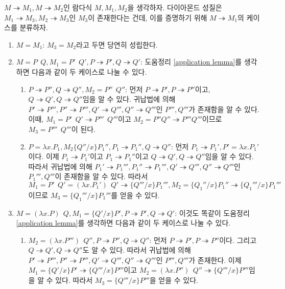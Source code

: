 \documentclass[b5paper, 11pt]{book}
\theoremstyle{definition}
\newenvironment{pf*}{\pushQED{\qed}\pf}
{\popQED\endpf}
\begin{document}
\begin{pf*}
    $M \twoheadrightarrow M_1, M \twoheadrightarrow M_2$인 람다식 $M, M_1, M_2$을 생각하자. 다이아몬드 성질은 $M_1 \twoheadrightarrow M_3, M_2 \twoheadrightarrow M_3$인 $M_3$이 존재한다는 건데, 이를 증명하기 위해 $M \twoheadrightarrow M_1$의 케이스를 분류하자.
    \begin{enumerate}
        \item $M = M_1$:
        $M_3 = M_2$라고 두면 당연히 성립한다.
        \item $M = P\;\, Q, M_1 = P' \;\, Q', P\twoheadrightarrow P', Q \twoheadrightarrow Q'$:
        도움정리 \ref{application lemma}를 생각하면 다음과 같이 두 케이스로 나눌 수 있다.
        \begin{enumerate}
            \item $P \twoheadrightarrow P'', Q \twoheadrightarrow Q'',  M_2 = P'' \;\, Q''$: 먼저 $P \twoheadrightarrow P', P \twoheadrightarrow P''$이고, $Q \twoheadrightarrow Q', Q \twoheadrightarrow Q''$임을 알 수 있다. 귀납법에 의해  $P' \twoheadrightarrow P''', P'' \twoheadrightarrow P''', Q' \twoheadrightarrow Q''', Q'' \twoheadrightarrow Q'''$인 $P''', Q'''$가 존재함을 알 수 있다. 이때, $M_1 = P' \;\, Q' \twoheadrightarrow P''' \;\, Q'''$이고 $M_2 = P'' Q'' \twoheadrightarrow P''' Q'''$이므로 $M_3 = P''' \;\, Q'''$이 된다.
             \item $P = \lambda x. P_1, M_2 \{Q'' / x\} P_1'' , P_1 \twoheadrightarrow P_1'',  Q \twoheadrightarrow Q''$: 먼저 $P_1 \twoheadrightarrow P_1', P' = \lambda x.P_1'$이다. 이제 $P_1 \twoheadrightarrow P_1'$이고 $P_1 \twoheadrightarrow P_1''$이고 $Q \twoheadrightarrow Q', Q\twoheadrightarrow Q''$임을 알 수 있다. 따라서 귀납법에 의해 $P_1' \twoheadrightarrow P_1''', P_1'' \twoheadrightarrow P_1''', Q' \twoheadrightarrow Q''', Q'' \twoheadrightarrow Q'''$인 $P_1''', Q'''$이 존재함을 알 수 있다. 따라서 $M_1 = P'\;\,Q' = (\lambda x. P_1')\;\, Q' \twoheadrightarrow \{Q'''/x\}P_1''', M_2 = \{Q_1''/x\}P_1'' \twoheadrightarrow \{Q_1''' / x\} P_1'''$이므로 $M_3 = \{Q_1'''/x\}P_1'''$를 얻을 수 있다.
        \end{enumerate}
        \item $M = (\lambda x. P) \;\, Q, M_1 = \{Q' / x \}P', P \twoheadrightarrow P', Q \twoheadrightarrow Q'$: 이것도 똑같이 도움정리 \ref{application lemma}를 생각하면 다음과 같이 두 케이스로 나눌 수 있다.
        \begin{enumerate}
            \item $M_2 = (\lambda x. P''') \;\, Q'', P \twoheadrightarrow P'', Q \twoheadrightarrow Q''$: 먼저 $P\twoheadrightarrow P', P \twoheadrightarrow P''$이다. 그리고 $Q \twoheadrightarrow Q', Q \twoheadrightarrow Q''$도 알 수 있다. 따라서 귀납법에 의해 $P' \twoheadrightarrow P''', P'' \twoheadrightarrow P''', Q' \twoheadrightarrow Q''', Q'' \twoheadrightarrow Q'''$인 $P''', Q'''$가 존재한다. 이제 $M_1 = \{Q'/x\}P' \twoheadrightarrow \{Q''' / x\} P'''$이고 $M_2 = (\lambda x. P'') \;\, Q'' \twoheadrightarrow \{Q''' / x\} P'''$임을 알 수 있다. 따라서 $M_3 = \{Q''' /x\} P'''$을 얻을 수 있다.

\end{enumerate}
\end{enumerate}
\end{pf*}
\end{document}
